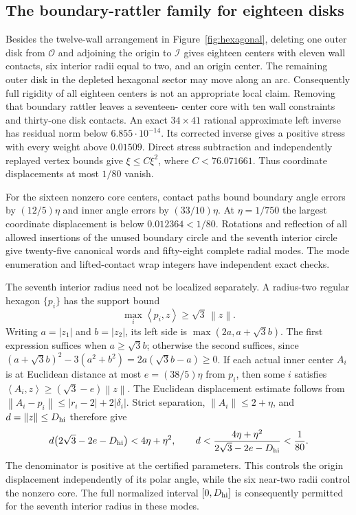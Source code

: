\documentclass[11pt]{amsart}
\theoremstyle{definition}
\theoremstyle{remark}
\newcommand{\norm}[1]{\left\lVert #1\right\rVert}
\newcommand{\ip}[2]{\left\langle #1,#2\right\rangle}
\begin{document}
\subsection{The boundary-rattler family for eighteen disks}
Besides the twelve-wall arrangement in Figure~\ref{fig:hexagonal}, deleting
one outer disk from $\mathcal O$ and adjoining the origin to $\mathcal I$
gives eighteen centers with eleven wall contacts, six interior radii equal
to two, and an origin center.
The remaining outer disk in the depleted hexagonal sector may move along
an arc. Consequently full rigidity of all eighteen centers is not an
appropriate local claim. Removing that boundary rattler leaves a seventeen-
center core with ten wall constraints and thirty-one disk contacts.
An exact $34\times41$ rational approximate left inverse has residual norm
below $6.855\cdot10^{-14}$. Its corrected inverse gives a positive stress
with every weight above $0.01509$. Direct stress subtraction and independently
replayed vertex bounds give $\xi\le C\xi^2$, where $C<76.071661$.
Thus coordinate displacements at most $1/80$ vanish.

For the sixteen nonzero core centers, contact paths bound boundary angle
errors by $(12/5)\eta$ and inner angle errors by $(33/10)\eta$.
At $\eta=1/750$ the largest coordinate displacement is below
$0.012364<1/80$. Rotations and reflection of all allowed insertions of
the unused boundary circle and the seventh interior circle give twenty-five
canonical words and fifty-eight complete radial modes. The mode enumeration
and lifted-contact wrap integers have independent exact checks.

The seventh interior radius need not be localized separately. A radius-two
regular hexagon $\{p_i\}$ has the support bound
\[
 \max_i\ip{p_i}{z}\ge\sqrt3\,\norm z.
\]
Writing $a=|z_1|$ and $b=|z_2|$, its left side is
$\max(2a,a+\sqrt3b)$. The first expression suffices when
$a\ge\sqrt3b$; otherwise the second suffices, since
$(a+\sqrt3b)^2-3(a^2+b^2)=2a(\sqrt3b-a)\ge0$.
If each actual inner center $A_i$ is at Euclidean distance at most
$e=(38/5)\eta$ from $p_i$, then some $i$ satisfies
$\ip{A_i}{z}\ge(\sqrt3-e)\norm z$.
The Euclidean displacement estimate follows from
$\norm{A_i-p_i}\le|r_i-2|+2|\delta_i|$.
Strict separation, $\norm{A_i}\le2+\eta$, and
$d=\norm z\le D_{\rm hi}$ therefore give
\[
 d\bigl(2\sqrt3-2e-D_{\rm hi}\bigr)<4\eta+\eta^2,
 \qquad
 d<\frac{4\eta+\eta^2}{2\sqrt3-2e-D_{\rm hi}}<\frac1{80}.
\]
The denominator is positive at the certified parameters. This controls the
origin displacement independently of its polar angle, while the six near-two
radii control the nonzero core. The full normalized interval $[0,D_{\rm hi}]$
is consequently permitted for the seventh interior radius in these modes.
\end{document}
